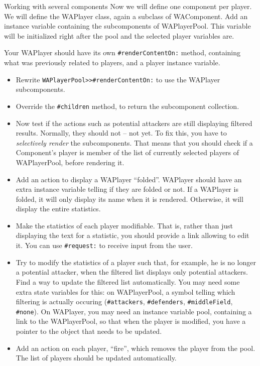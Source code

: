 \documentclass[a4paper,10pt]{scrartcl}
\begin{document}
\begin{exercise}{Working with several components}
	Now we will define one component per player. We will define the WAPlayer class, again a subclass of WAComponent. Add an instance variable containing the subcomponents of WAPlayerPool. This variable will be initialized right after the pool and the selected player variables are. 

	Your WAPlayer should have its own \verb+#renderContentOn:+ method, containing what was previously related to players, and a player instance variable.

\begin{itemize}
	\item Rewrite \verb+WAPlayerPool>>#renderContentOn:+ to use the WAPlayer subcomponents.
	\item Override the \verb+#children+ method, to return the subcomponent collection.
	\item Now test if the actions such as potential attackers are still displaying filtered results. Normally, they should not -- not yet. To fix this, you have to \emph{selectively render} the subcomponents. That means that you should check if a Component's player is member of the list of currently selected players of WAPlayerPool, before rendering it.
	\item Add an action to display a WAPlayer ``folded''. WAPlayer should have an extra instance variable telling if they are folded or not. If a WAPlayer is folded, it will only display its name when it is rendered. Otherwise, it will display the entire statistics.
	\item Make the statistics of each player modifiable. That is, rather than just displaying the text for a statistic, you should provide a link allowing to edit it. You can use \verb+#request:+ to receive input from the user.
	\item Try to modify the statistics of a player such that, for example, he is no longer a potential attacker, when the filtered list displays only potential attackers. Find a way to update the filtered list automatically. \hint{}You may need some extra state variables for this: on WAPlayerPool, a symbol telling which filtering is actually occuring (\verb+#attackers+, \verb+#defenders+, \verb+#middleField+, \verb+#none+). On WAPlayer, you may need an instance variable pool, containing a link to the WAPlayerPool, so that when the player is modified, you have a pointer to the object that needs to be updated.
	\item Add an action on each player, ``fire'', which removes the player from the pool. The list of players should be updated automatically.
\end{itemize}
\end{exercise}
\end{document}
